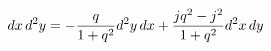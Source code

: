 \begin{equation}
dx\, d^{2}y=-\frac{q}{1+q^{2}}d^{2}y\, dx+\frac{jq^{2}-j^{2}}{%
1+q^{2}}d^{2}x\, dy
\end{equation}

